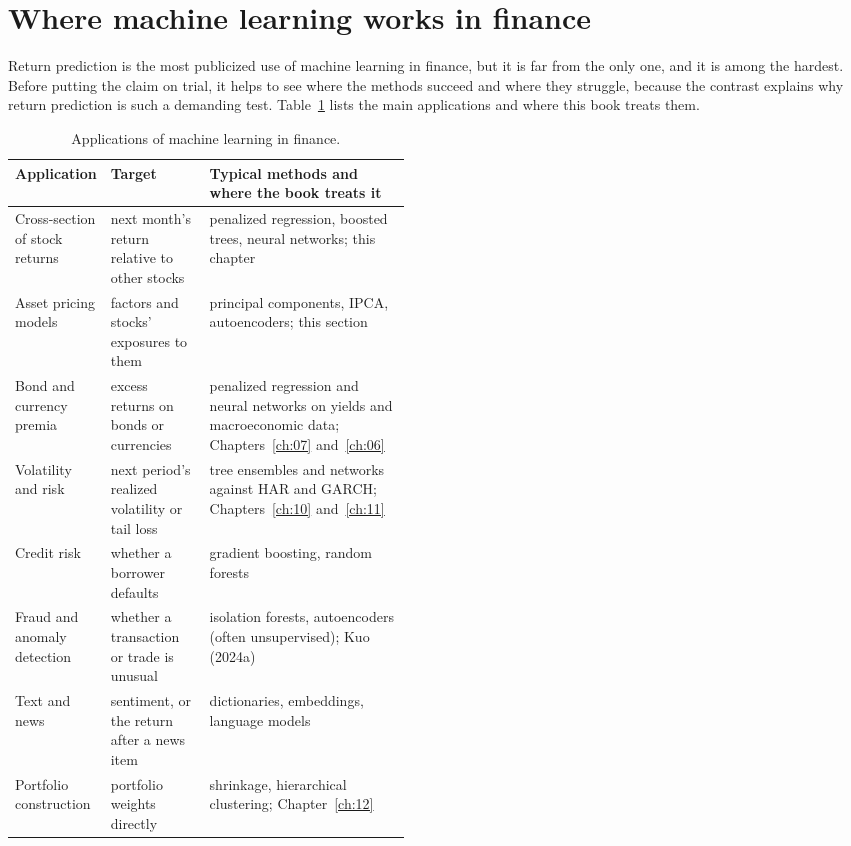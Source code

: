 \section{Where machine learning works in finance}
\label{sec:20-applications}

Return prediction is the most publicized use of machine learning in finance, but it is far from the only one, and it is among the hardest. Before putting the claim on trial, it helps to see where the methods succeed and where they struggle, because the contrast explains why return prediction is such a demanding test. Table~\ref{tab:20-applications} lists the main applications and where this book treats them.

\begin{table}[htbp]
\centering
\small
\caption{Applications of machine learning in finance.}
\label{tab:20-applications}
\begin{tabularx}{0.95\linewidth}{@{}>{\raggedright\arraybackslash}p{0.21\linewidth}>{\raggedright\arraybackslash}p{0.25\linewidth}>{\raggedright\arraybackslash}X@{}}
\toprule
Application & Target & Typical methods and where the book treats it \\
\midrule
Cross-section of stock returns & next month's return relative to other stocks & penalized regression, boosted trees, neural networks; this chapter \\
Asset pricing models & factors and stocks' exposures to them & principal components, IPCA, autoencoders; this section \\
Bond and currency premia & excess returns on bonds or currencies & penalized regression and neural networks on yields and macroeconomic data; Chapters~\ref{ch:07} and~\ref{ch:06} \\
Volatility and risk & next period's realized volatility or tail loss & tree ensembles and networks against HAR and GARCH; Chapters~\ref{ch:10} and~\ref{ch:11} \\
Credit risk & whether a borrower defaults & gradient boosting, random forests \\
Fraud and anomaly detection & whether a transaction or trade is unusual & isolation forests, autoencoders (often unsupervised); Kuo (2024a) \\
Text and news & sentiment, or the return after a news item & dictionaries, embeddings, language models \\
Portfolio construction & portfolio weights directly & shrinkage, hierarchical clustering; Chapter~\ref{ch:12} \\
\bottomrule
\end{tabularx}
\end{table}

